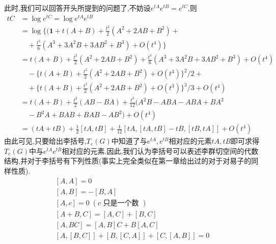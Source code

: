 此时,我们可以回答开头所提到的问题了,不妨设$e^{tA}e^{tB}=e^{tC}$,则
\begin{equation}
	\begin{aligned}
		tC&=\log e^{tC}=\log e^{tA}e^{tB}\\
		&=\log\{(\textbf{1}+t(A+B)+\frac{t^{2}}{2}(A^{2}+2AB+B^{2})+ \\
		&\quad+\frac{t^{3}}{6}(A^{3}+3A^{2}B+3AB^{2}+B^{3})+O(t^{4})\} \\
		&=t(A+B)+\frac{t^{2}}{2}(A^{2}+2AB+B^{2})+\frac{t^{3}}{6}(A^{3}+3A^{2}B+3AB^{2}+B^{3})+O(t^{4}) \\
		&\quad-\{t(A+B)+\frac{t^2}{2}(A^2+2AB+B^2)+O(t^3)\}^2/2+ \\
		&\quad+\{t(A+B)+\frac{t^{2}}{2}(A^{2}+2AB+B^{2})+O(t^{3})\}^{3}/3+O(t^{4}) \\
		&=t(A+B)+\frac{t^{2}}{2}(AB-BA)+\frac{t^{3}}{12}(A^{2}B-ABA-ABA+BA^{2} \\
		&\quad-B^2A+BAB+BAB-AB^2)+O(t^4) \\
		&=(tA+tB)+\frac{1}{2}[tA,tB]+\frac{1}{12}[tA,[tA,tB]-tB,[tB,tA]]+O(t^{4}) 
	\end{aligned}
\end{equation}
由此可见,只要给出李括号,$T_e(G)$中知道了与$e^{tA},e^{tB}$相对应的元素$tA,tB$即可求得$T_e(G)$中与$e^{tA}e^{tB}$相对应的元素.因此,我们认为李括号可以表述李群切空间的代数结构,并对于李括号有下列性质(事实上完全类似在第一章给出过的对于对易子的同样性质).
\begin{equation}
	\begin{gathered}
		\left\lbrack {A, A}\right\rbrack = 0\\
		\left\lbrack {A, B}\right\rbrack = - \left\lbrack {B, A}\right\rbrack\\
		\left\lbrack {A, c}\right\rbrack = 0\;\left( {c\text{ 只是一个数 }}\right)\\
		\left\lbrack {A + B, C}\right\rbrack = \left\lbrack {A, C}\right\rbrack + \left\lbrack {B, C}\right\rbrack\\
		\left\lbrack {A,{BC}}\right\rbrack = \left\lbrack {A, B}\right\rbrack C + B\left\lbrack {A, C}\right\rbrack\\
		\left\lbrack {A,\left\lbrack {B, C}\right\rbrack }\right\rbrack + \left\lbrack {B,\left\lbrack {C, A}\right\rbrack }\right\rbrack + \left\lbrack {C,\left\lbrack {A, B}\right\rbrack }\right\rbrack = 0
	\end{gathered}
\end{equation}

